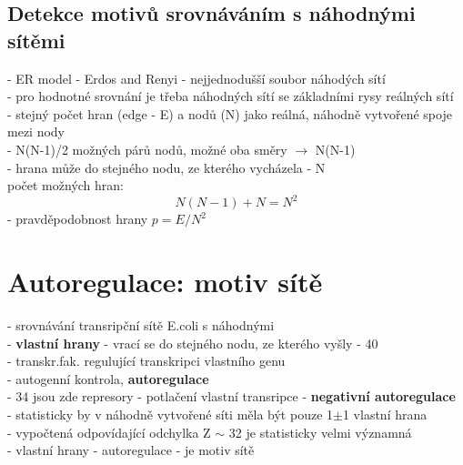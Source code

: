\documentclass[11pt,a4paper]{report}
\begin{document}
\subsection{Detekce motivů srovnáváním s náhodnými sítěmi}
- ER model - Erdos and Renyi - nejjednodušší soubor náhodých sítí\\
- pro hodnotné srovnání je třeba náhodných sítí se základními rysy reálných sítí\\
\indent - stejný počet hran (edge - E) a nodů (N) jako reálná, náhodně vytvořené spoje mezi nody\\
\indent - N(N-1)/2 možných párů nodů, možné oba směry $\rightarrow$ N(N-1)\\
\indent - hrana může do stejného nodu, ze kterého vycházela - N\\
\indent počet možných hran:
\begin{equation}
N(N-1)+N=N^2
\end{equation}
\indent - pravděpodobnost hrany $p=E/N^2$

\section{Autoregulace: motiv sítě}
- srovnávání transripční sítě E.coli s náhodnými\\
- \textbf{vlastní hrany} - vrací se do stejného nodu, ze kterého vyšly - 40\\
\indent - transkr.fak. regulující transkripci vlastního genu\\
\indent \indent - autogenní kontrola, \textbf{autoregulace}\\
\indent - 34 jsou zde represory - potlačení vlastní transripce - \textbf{negativní autoregulace}\\
\indent - statisticky by v náhodně vytvořené síti měla být pouze 1$\pm$1 vlastní hrana\\
\indent - vypočtená odpovídající odchylka Z $\sim$ 32 je statisticky velmi významná\\
\indent - vlastní hrany - autoregulace - je motiv sítě\\
\end{document}
